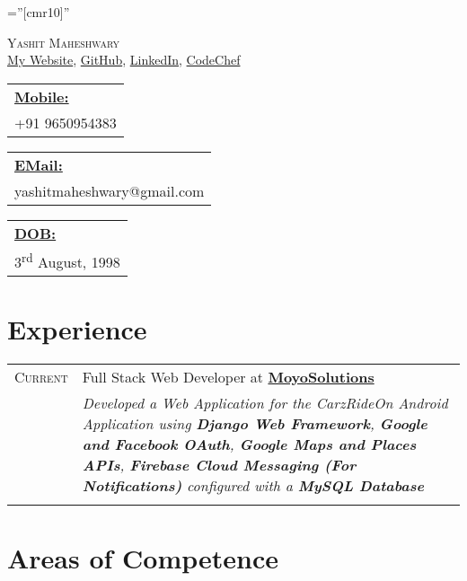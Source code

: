 \documentclass[a4paper,10pt]{article}
\begin{document}
\pagestyle{empty}

\font\fb=''[cmr10]''

\par{\centering
		{\Huge \textsc{Yashit Maheshwary}\\
		}
		\href{https://yashitm.tech/}{My Website}, \href{https://www.github.com/YashitM}{GitHub}, \href{https://www.linkedin.com/in/yashit-maheshwary-aa8078b2/}{LinkedIn}, \href{https://www.codechef.com/users/yashitm}{CodeChef}
	\par}
\begin{tabular}[t]{@{}l} 
    \underline{\textbf{Mobile:}}\\  +91 9650954383
\end{tabular}
\hfill
\begin{tabular}[t]{l@{}}
    \underline{\textbf{EMail:}}\\ yashitmaheshwary@gmail.com
\end{tabular}
\hfill
\begin{tabular}[t]{l@{}}
    \underline{\textbf{DOB:}}\\ 3\textsuperscript{rd} August, 1998
\end{tabular}

\section{Experience}
\begin{tabular}{r|p{14cm}}
\textsc{Current} & Full Stack Web Developer at \href{http://www.moyosolutions.online}{\textbf{MoyoSolutions}}\\
& \emph{\small{Developed a Web Application for the CarzRideOn Android Application using \textbf{Django Web Framework}, \textbf{Google and Facebook OAuth}, \textbf{Google Maps and Places APIs}, \textbf{Firebase Cloud Messaging (For Notifications)} configured with a \textbf{MySQL Database}}}\\\multicolumn{2}{c}{}
\end{tabular}


\section{Areas of Competence}
\begin{Parallel}{0.45\textwidth}{0.53\textwidth}
\ParallelPar
\end{Parallel}
\end{document}

